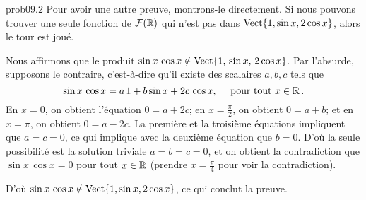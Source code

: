 \begin{sol}{prob09.2}
Pour avoir une autre preuve, montrons-le directement. Si nous pouvons trouver une seule fonction de $\F(\R)$ qui n'est pas dans $\sp{1, \sin x, 2 \cos x}$, alors le tour est joué. 

Nous affirmons que le produit $\sin x \, \cos x \notin \sp{1,\, \sin x,\, 2 \cos x}$. Par l'absurde, supposons le contraire, c'est-à-dire qu'il existe des scalaires $a,b,c$ tels que 
$$ \sin x \, \cos x= a\,1 + b \sin x + 2c\, \cos x, \quad \text{ pour tout } x\in \R\,.$$
En $x=0$, on obtient l'équation $0=a+2c$; en $x=\frac{\pi}{2}$, on obtient $0=a+b$; et en  $x= \pi $, on obtient $0=a-2c$. La première et la troisième équations impliquent que $a=c=0$, ce qui implique avec la deuxième équation que $b=0$. D'où la seule possibilité est la solution triviale $a=b=c=0$, et on obtient la contradiction que $ \sin x \, \cos x =0$ pour tout $x\in \R$ (prendre $x=\frac{\pi}4$ pour voir la contradiction). 

D'o\`u $\sin x \, \cos x \notin \sp{1, \sin x, 2 \cos x}$, ce qui conclut la preuve.








\end{sol}


